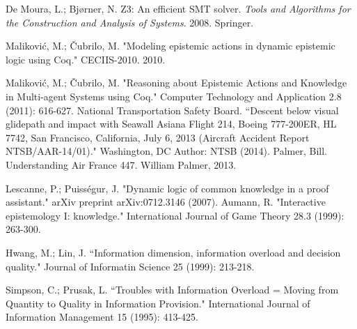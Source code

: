 \begin{thebibliography}{9}
 		 De Moura, L.; Bj{\o}rner, N. Z3: An efficient SMT solver. \emph{Tools and Algorithms for the Construction and Analysis of Systems}. 2008. Springer.
	 	
	 	Malikovi\'c, M.; \v Cubrilo, M. "Modeling epistemic actions in dynamic epistemic logic using Coq." CECIIS-2010. 2010.
	 	
	 	Malikovi\'c, M.; \v Cubrilo, M. "Reasoning about Epistemic Actions and Knowledge in Multi-agent Systems using Coq." Computer Technology and Application 2.8 (2011): 616-627.
	 	National Transportation Safety Board. ``Descent below visual glidepath and impact with Seawall Asiana Flight 214, Boeing 777-200ER, HL 7742, San Francisco, California, July 6, 2013 (Aircraft Accident Report NTSB/AAR-14/01)." Washington, DC Author: NTSB (2014).
	 	Palmer, Bill. Understanding Air France 447. William Palmer, 2013.
	 	
	 	Lescanne, P.; Puiss\'egur, J. "Dynamic logic of common knowledge in a proof assistant." arXiv preprint arXiv:0712.3146 (2007).
	 	Aumann, R. "Interactive epistemology I: knowledge." International Journal of Game Theory 28.3 (1999): 263-300.
	 	
	 	Hwang, M.; Lin, J. ``Information dimension, information overload and decision quality." Journal of Informatin Science 25 (1999): 213-218.
	 	
	 	Simpson, C.; Prusak, L. ``Troubles with Information Overload = Moving from Quantity to Quality in Information Provision." International Journal of Information Management 15 (1995): 413-425.
\end{thebibliography}
